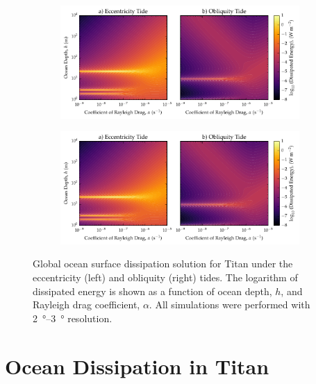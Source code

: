 \begin{figure}[!t]
    \centering
    \begin{subfigure}[t]{0.85\linewidth} %
        \includegraphics[width=\linewidth]{Figures/titan_linear}
        \label{fig:lincEccTitan}
    \end{subfigure}
    \begin{subfigure}[t]{0\linewidth} %
         \includegraphics[width=\linewidth]{Figures/titan_linear}
         \label{fig:linObliqTitan}   
    \end{subfigure}
    \vspace{-0.5cm}
\caption{Global ocean surface dissipation solution for Titan under the eccentricity (left) and obliquity (right) tides. The logarithm of dissipated energy is shown as a function of ocean depth, $h$, and Rayleigh drag coefficient, $\alpha$. All simulations were performed with \SIrange{2}{3}{\degree} resolution.}
\label{fig:linTitan}
\end{figure}

\section{Ocean Dissipation in Titan \label{sec:results_Titan}}

